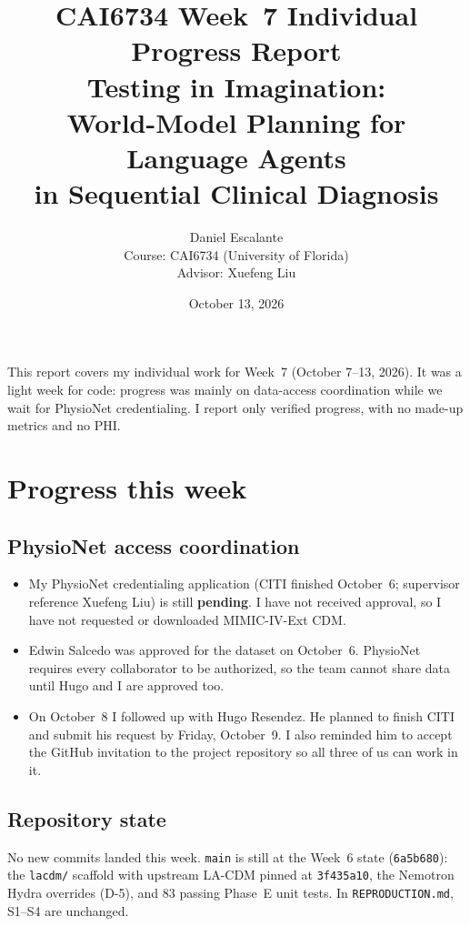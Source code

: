 \documentclass[11pt,letterpaper]{article}
\title{\textbf{CAI6734 Week~7 Individual Progress Report}\\[0.35em]
\large Testing in Imagination:\\
World-Model Planning for Language Agents\\
in Sequential Clinical Diagnosis}
\author{Daniel Escalante\\[0.4em]
\small Course: CAI6734 (University of Florida)\\
Advisor: Xuefeng Liu}
\date{October 13, 2026}
\begin{document}
\maketitle
\thispagestyle{empty}

\noindent
This report covers my individual work for Week~7 (October 7--13, 2026). It was a light week for code: progress was mainly on data-access coordination while we wait for PhysioNet credentialing. I report only verified progress, with no made-up metrics and no PHI.

\section{Progress this week}

\subsection{PhysioNet access coordination}
\begin{itemize}
  \item My PhysioNet credentialing application (CITI finished October~6; supervisor reference Xuefeng Liu) is still \textbf{pending}. I have not received approval, so I have not requested or downloaded MIMIC-IV-Ext CDM.
  \item Edwin Salcedo was approved for the dataset on October~6. PhysioNet requires every collaborator to be authorized, so the team cannot share data until Hugo and I are approved too.
  \item On October~8 I followed up with Hugo Resendez. He planned to finish CITI and submit his request by Friday, October~9. I also reminded him to accept the GitHub invitation to the project repository so all three of us can work in it.
\end{itemize}

\subsection{Repository state}
No new commits landed this week. \texttt{main} is still at the Week~6 state (\texttt{6a5b680}): the \texttt{lacdm/} scaffold with upstream LA-CDM pinned at \texttt{3f435a10}, the Nemotron Hydra overrides (D-5), and 83 passing Phase~E unit tests. In \texttt{REPRODUCTION.md}, S1--S4 are unchanged.
\end{document}
